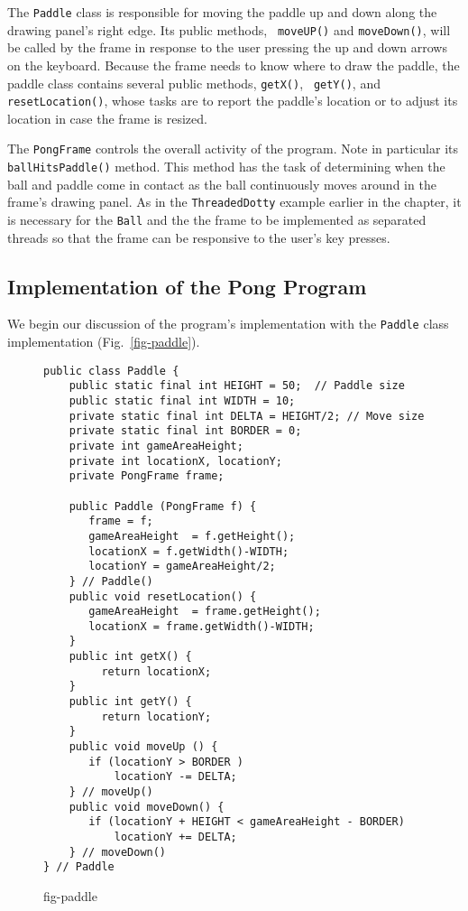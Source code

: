 The {\tt Paddle} class is responsible for moving the paddle up and
down along the drawing panel's right edge. Its public methods, {\tt
moveUP()} and {\tt moveDown()},  will be called by the frame in
response to the user pressing the up and down arrows on the
keyboard.  Because the frame needs to know where to draw the paddle,
the paddle class contains several public methods, {\tt getX()}, {\tt
getY()}, and {\tt resetLocation()}, whose tasks are to report the
paddle's location or to adjust its location in case the frame
is resized.

The {\tt PongFrame} controls the overall activity of the program.
Note in particular its {\tt ballHitsPaddle()} method. This method has
the task of determining when the ball and paddle come in contact as
the ball continuously moves around in the frame's drawing panel.  As
in the {\tt ThreadedDotty} example earlier in the chapter, it is
necessary for the {\tt Ball} and the the frame to be implemented as
separated threads so that the frame can be responsive to the user's
key presses.

\subsection{Implementation of the Pong Program}

We begin our discussion of the program's implementation with the {\tt Paddle} class
implementation (Fig.~\ref{fig-paddle}).
\begin{figure}[htb]
\jjjprogstart
\begin{jjjlisting}[27pc]
\begin{lstlisting}
public class Paddle {
    public static final int HEIGHT = 50;  // Paddle size
    public static final int WIDTH = 10;       
    private static final int DELTA = HEIGHT/2; // Move size
    private static final int BORDER = 0;
    private int gameAreaHeight;
    private int locationX, locationY;
    private PongFrame frame;

    public Paddle (PongFrame f) {
       frame = f;
       gameAreaHeight  = f.getHeight();
       locationX = f.getWidth()-WIDTH;
       locationY = gameAreaHeight/2;
    } // Paddle()
    public void resetLocation() {
       gameAreaHeight  = frame.getHeight();
       locationX = frame.getWidth()-WIDTH;
    }
    public int getX() {
         return locationX;
    }
    public int getY() {
         return locationY;
    }
    public void moveUp () {
       if (locationY > BORDER )
           locationY -= DELTA;
    } // moveUp()
    public void moveDown() {
       if (locationY + HEIGHT < gameAreaHeight - BORDER)
           locationY += DELTA;
    } // moveDown()
} // Paddle
\end{lstlisting}
\end{jjjlisting}
{fig-paddle}
\end{figure}


